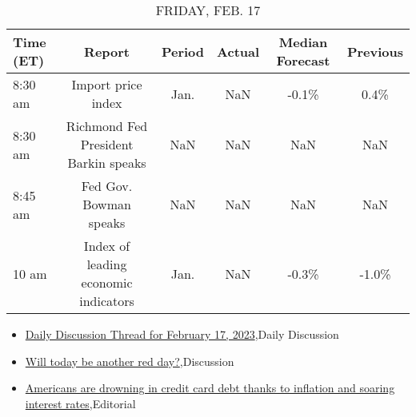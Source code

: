 \documentclass{article}%
\begin{document}
\begin{table}[htbp]%
\caption{FRIDAY, FEB. 17}%
\centering%
\begin{adjustbox}{width=1\textwidth}%
\begin{tabular}{lccccc}
\toprule
Time (ET) &                               Report & Period & Actual & Median Forecast & Previous \\
\midrule
  8:30 am &                   Import price index &   Jan. &    NaN &           -0.1\% &     0.4\% \\
  8:30 am & Richmond Fed President Barkin speaks &    NaN &    NaN &             NaN &      NaN \\
  8:45 am &               Fed Gov. Bowman speaks &    NaN &    NaN &             NaN &      NaN \\
    10 am & Index of leading economic indicators &   Jan. &    NaN &           -0.3\% &    -1.0\% \\
\bottomrule
\end{tabular}
%
\end{adjustbox}%
\end{table}

%
\begin{itemize}%
\item%
\href{https://reddit.com/r/wallstreetbets/comments/114hmbu/daily\_discussion\_thread\_for\_february\_17\_2023/}{Daily Discussion Thread for February 17, 2023},Daily Discussion%
\item%
\href{https://reddit.com/r/StockMarket/comments/114ihz4/will\_today\_be\_another\_red\_day/}{Will today be another red day?},Discussion%
\item%
\href{https://reddit.com/r/Economics/comments/114f42r/americans\_are\_drowning\_in\_credit\_card\_debt\_thanks/}{Americans are drowning in credit card debt thanks to inflation and soaring interest rates},Editorial%
\end{itemize}%
\end{document}

